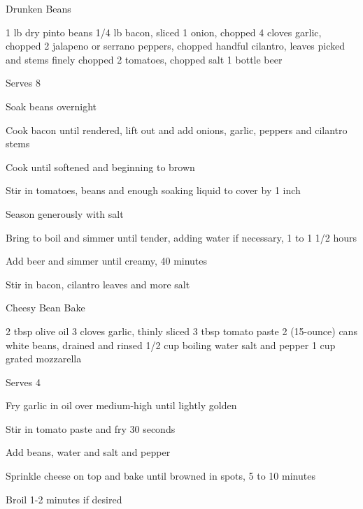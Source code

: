 \begin{denserecipe}{Drunken Beans}{}
\begin{ingredients}
1 lb dry pinto beans
1/4 lb bacon, sliced
1 onion, chopped
4 cloves garlic, chopped
2 jalapeno or serrano peppers, chopped
handful cilantro, leaves picked and stems finely chopped
2 tomatoes, chopped
salt
1 bottle beer
\end{ingredients}
\nextcolumn
Serves 8
\begin{steps}
    \item Soak beans overnight
    \item Cook bacon until rendered, lift out and add onions, garlic, peppers and cilantro stems
    \item Cook until softened and beginning to brown
    \item Stir in tomatoes, beans and enough soaking liquid to cover by 1 inch
    \item Season generously with salt
    \item Bring to boil and simmer until tender, adding water if necessary, 1 to 1 1/2 hours
    \item Add beer and simmer until creamy, 40 minutes
    \item Stir in bacon, cilantro leaves and more salt
\end{steps}
\end{denserecipe}

\begin{recipe}{Cheesy Bean Bake}{\vegetarian{}}
\begin{ingredients}
2 tbsp olive oil
3 cloves garlic, thinly sliced
3 tbsp tomato paste
2 (15-ounce) cans white beans, drained and rinsed
1/2 cup boiling water
salt and pepper
1 cup grated mozzarella
\end{ingredients}
\nextcolumn
Serves 4
\begin{steps}
    \item Fry garlic in oil over medium-high until lightly golden
    \item Stir in tomato paste and fry 30 seconds
    \item Add beans, water and salt and pepper
    \item Sprinkle cheese on top and bake until browned in spots, 5 to 10 minutes
    \item Broil 1-2 minutes if desired
\end{steps}
\end{recipe}

